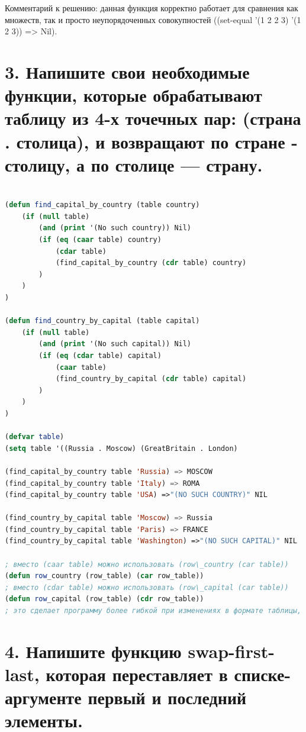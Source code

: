 \documentclass[12pt]{report}
\begin{document}
Комментарий к решению: данная функция корректно работает для сравнения как множеств, так и просто неупорядоченных совокупностей ((set-equal '(1 2 2 3) '(1 2 3)) => Nil).

\clearpage
\section*{3. Напишите свои необходимые функции, которые обрабатывают таблицу из 4-х точечных пар: (страна . столица), и возвращают по стране - столицу, а по столице — страну.}



\begin{lstlisting}[language=Lisp]

(defun find_capital_by_country (table country)
	(if (null table)
		(and (print '(No such country)) Nil)
		(if (eq (caar table) country)
			(cdar table)
			(find_capital_by_country (cdr table) country)
		)
	)
)

(defun find_country_by_capital (table capital)
	(if (null table)
		(and (print '(No such capital)) Nil)
		(if (eq (cdar table) capital)
			(caar table)
			(find_country_by_capital (cdr table) capital)
		)
	)
)

(defvar table)
(setq table '((Russia . Moscow) (GreatBritain . London)                  (France . Paris) (Italy . Roma)))

(find_capital_by_country table 'Russia) => MOSCOW
(find_capital_by_country table 'Italy) => ROMA
(find_capital_by_country table 'USA) =>"(NO SUCH COUNTRY)" NIL

(find_country_by_capital table 'Moscow) => Russia
(find_country_by_capital table 'Paris) => FRANCE
(find_country_by_capital table 'Washington) =>"(NO SUCH CAPITAL)" NIL

; вместо (caar table) можно использовать (row\_country (car table))
(defun row_country (row_table) (car row_table))
; вместо (cdar table) можно использовать (row\_capital (car table))
(defun row_capital (row_table) (cdr row_table))
; это сделает программу более гибкой при изменениях в формате таблицы, но медленней
\end{lstlisting}

\section*{4. Напишите функцию swap-first-last, которая переставляет в списке-аргументе первый и последний элементы.}
\end{document}
